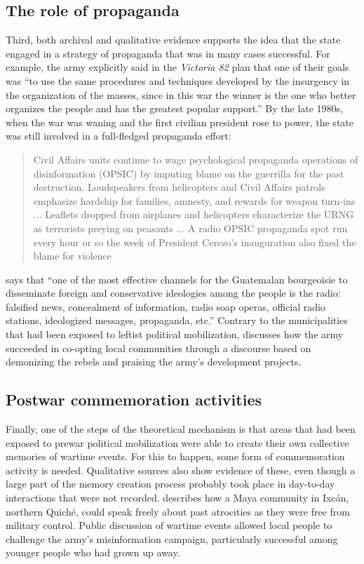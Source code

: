 \documentclass[12pt, notitlepage]{article}
\begin{document}
\subsection*{The role of propaganda}

Third, both archival and qualitative evidence supports the idea that the state engaged in a strategy of propaganda that was in many cases successful.
For example, the army explicitly said in the \textit{Victoria 82} plan that one of their goals was ``to use the same procedures and techniques developed by the insurgency in the organization of the masses, since in this war the winner is the one who better organizes the people and has the greatest popular support.'' \citep[quoted in][II, 191]{CEH:1999aa}
By the late 1980s, when the war was waning and the first civilian president rose to power, the state was still involved in a full-fledged propaganda effort:

\begin{quote}
  Civil Affairs units continue to wage psychological propaganda operations of disinformation (OPSIC) by imputing blame on the guerrilla for the past destruction. Loudspeakers from helicopters and Civil Affairs patrols emphasize hardship for families, amnesty, and rewards for weapon turn-ins ... Leaflets dropped from airplanes and helicopters characterize the URNG as terrorists preying on peasants ... A radio OPSIC propaganda spot run every hour or so the week of President Cerezo's inauguration also fixed the blame for violence \citep[111]{Schirmer:1998wa}
\end{quote}

\citet[16]{Bran:1985tc} says that ``one of the most effective channels for the Guatemalan bourgeoisie to disseminate foreign and conservative ideologies among the people is the radio: falsified news, concealment of information, radio soap operas, official radio stations, ideologized messages, propaganda, etc.''
Contrary to the municipalities that had been exposed to leftist political mobilization, \citet{Esparza:2018uw} discusses how the army succeeded in co-opting local communities through a discourse based on demonizing the rebels and praising the army's development projects.

\subsection*{Postwar commemoration activities}

Finally, one of the steps of the theoretical mechanism is that areas that had been exposed to prewar political mobilization were able to create their own collective memories of wartime events.
For this to happen, some form of commemoration activity is needed.
Qualitative sources also show evidence of these, even though a large part of the memory creation process probably took place in day-to-day interactions that were not recorded.
\citet{Falla:2006vu} describes how a Maya community in Ixcán, northern Quiché, could speak freely about past atrocities as they were free from military control.
Public discussion of wartime events allowed local people to challenge the army's misinformation campaign, particularly successful among younger people who had grown up away.
\end{document}
